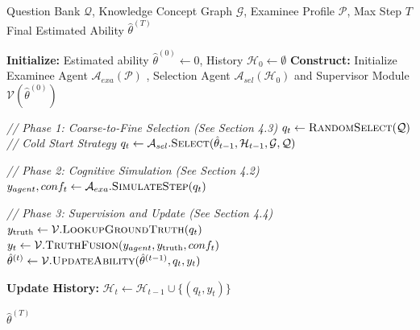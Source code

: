 \begin{algorithm}[!t]
\caption{AgentCAT Interaction Process}
\label{alg:agentcat}
\begin{algorithmic}[1]
\REQUIRE Question Bank $\mathcal{Q}$, Knowledge Concept Graph $\mathcal{G}$, Examinee Profile $\mathcal{P}$, Max Step $T$
\ENSURE Final Estimated Ability $\hat{\theta}^{(T)}$

\STATE \textbf{Initialize:} Estimated ability $\hat{\theta}^{(0)} \leftarrow 0$, History $\mathcal{H}_0 \leftarrow \emptyset$
\STATE \textbf{Construct:} Initialize Examinee Agent $\mathcal{A}_{exa}(\mathcal{P})$ , Selection Agent $\mathcal{A}_{sel}(\mathcal{H}_0 )$ and Supervisor Module $\mathcal{V}(\hat{\theta}^{(0)})$

    \STATE \textit{// Phase 1: Coarse-to-Fine Selection (See Section 4.3)}
        \STATE $q_t \leftarrow \textsc{RandomSelect}(\mathcal{Q})$ \quad \textit{// Cold Start Strategy}
    \ELSE
        \STATE $q_t \leftarrow \mathcal{A}_{sel}.\textsc{Select}(\hat{\theta}_{t-1}, \mathcal{H}_{t-1}, \mathcal{G}, \mathcal{Q})$
    \ENDIF
    
    \STATE \textit{// Phase 2: Cognitive Simulation (See Section 4.2)}
    \STATE $y_{agent}, conf_t \leftarrow \mathcal{A}_{exa}.\textsc{SimulateStep}(q_t)$
    
    \STATE \textit{// Phase 3: Supervision and Update (See Section 4.4)}
    \STATE $y_{\text{truth}} \leftarrow \mathcal{V}.\textsc{LookupGroundTruth}(q_t)$
    \STATE $y_t \leftarrow \mathcal{V}.\textsc{TruthFusion}(y_{agent}, y_{\text{truth}}, conf_t)$
    \STATE $\hat{\theta}^{(t)} \leftarrow \mathcal{V}.\textsc{UpdateAbility}(\hat{\theta}^{(t-1)}, q_t, y_t)$
    
    \STATE \textbf{Update History:} $\mathcal{H}_t \leftarrow \mathcal{H}_{t-1} \cup \{(q_t, y_t)\}$
\ENDFOR

\RETURN $\hat{\theta}^{(T)}$
\end{algorithmic}
\end{algorithm}